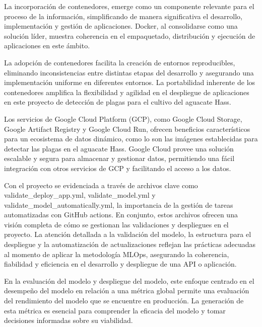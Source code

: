 La incorporación de contenedores, emerge como un componente relevante para el proceso de la información, simplificando de manera significativa el desarrollo, implementación y gestión de aplicaciones. Docker, al consolidarse como una solución líder, muestra coherencia en el empaquetado, distribución y ejecución de aplicaciones en este ámbito. \newline

La adopción de contenedores facilita la creación de entornos reproducibles, eliminando inconsistencias entre distintas etapas del desarrollo y asegurando una implementación uniforme en diferentes entornos. La portabilidad inherente de los contenedores amplifica la flexibilidad y agilidad en el despliegue de aplicaciones en este proyecto de detección de plagas para el cultivo del aguacate Hass. \newline

Los servicios de Google Cloud Platform (GCP), como Google Cloud Storage, Google Artifact Registry y Google Cloud Run, ofrecen beneficios característicos para un ecosistema de datos dinámico, como lo son las imágenes establecidas para detectar las plagas en el aguacate Hass. Google Cloud provee una solución escalable y segura para almacenar y gestionar datos, permitiendo una fácil integración con otros servicios de GCP y facilitando el acceso a los datos. 

\newpage

Con el proyecto se evidenciada a través de archivos clave como \\ validate\_deploy\_app.yml, validate\_model.yml y validate\_model\_automatically.yml, la importancia de la gestión de tareas automatizadas con GitHub actions. En conjunto, estos archivos ofrecen una visión completa de cómo se gestionan las validaciones y despliegues en el proyecto. La atención detallada a la validación del modelo, la estructura para el despliegue y la automatización de actualizaciones reflejan las prácticas adecuadas al momento de aplicar la metodología MLOps, asegurando la coherencia, fiabilidad y eficiencia en el desarrollo y despliegue de una API o aplicación. \newline

En la evaluación del modelo y despliegue del modelo, este enfoque centrado en el desempeño del modelo en relación a una métrica global permite una evaluación del rendimiento del modelo que se encuentre en producción. La generación de esta métrica es esencial para comprender la eficacia del modelo y tomar decisiones informadas sobre su viabilidad. \newline

